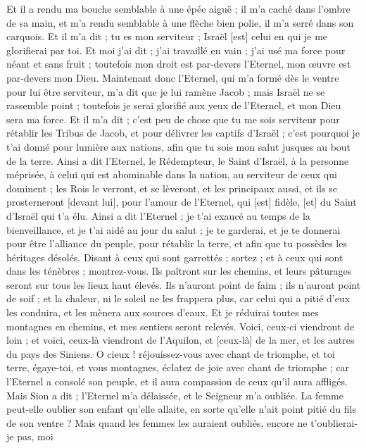 \begin{multicols}{2}
Et il a rendu ma bouche semblable à une épée aiguë ; il m'a caché dans l'ombre de sa main, et m'a rendu semblable à une flèche bien polie, il m'a serré dans son carquois.
Et il m'a dit ; tu es mon serviteur ; Israël [est] celui en qui je me glorifierai par toi.
Et moi j'ai dit ; j'ai travaillé en vain ; j'ai usé ma force pour néant et sans fruit ; toutefois mon droit est par-devers l'Eternel, mon œuvre est par-devers mon Dieu.
Maintenant donc l'Eternel, qui m'a formé dès le ventre pour lui être serviteur, m'a dit que je lui ramène Jacob ; mais Israël ne se rassemble point ; toutefois je serai glorifié aux yeux de l'Eternel, et mon Dieu sera ma force.
Et il m'a dit ; c'est peu de chose que tu me sois serviteur pour rétablir les Tribus de Jacob, et pour délivrer les captifs d'Israël ; c'est pourquoi je t'ai donné pour lumière aux nations, afin que tu sois mon salut jusques au bout de la terre.
Ainsi a dit l'Eternel, le Rédempteur, le Saint d'Israël, à la personne méprisée, à celui qui est abominable dans la nation, au serviteur de ceux qui dominent ; les Rois le verront, et se lèveront, et les principaux aussi, et ils se prosterneront [devant lui], pour l'amour de l'Eternel, qui [est] fidèle, [et] du Saint d'Israël qui t'a élu.
Ainsi a dit l'Eternel ; je t'ai exaucé au temps de la bienveillance, et je t'ai aidé au jour du salut ; je te garderai, et je te donnerai pour être l'alliance du peuple, pour rétablir la terre, et afin que tu possèdes les héritages désolés.
Disant à ceux qui sont garrottés ; sortez ; et à ceux qui sont dans les ténèbres ; montrez-vous. Ils paîtront sur les chemins, et leurs pâturages seront sur tous les lieux haut élevés.
Ils n'auront point de faim ; ils n'auront point de soif ; et la chaleur, ni le soleil ne les frappera plus, car celui qui a pitié d'eux les conduira, et les mènera aux sources d'eaux.
Et je réduirai toutes mes montagnes en chemins, et mes sentiers seront relevés.
Voici, ceux-ci viendront de loin ; et voici, ceux-là viendront de l'Aquilon, et [ceux-là] de la mer, et les autres du pays des Siniens.
O cieux ! réjouissez-vous avec chant de triomphe, et toi terre, égaye-toi, et vous montagnes, éclatez de joie avec chant de triomphe ; car l'Eternel a consolé son peuple, et il aura compassion de ceux qu'il aura affligés.
Mais Sion a dit ; l'Eternel m'a délaissée, et le Seigneur m'a oubliée.
La femme peut-elle oublier son enfant qu'elle allaite, en sorte qu'elle n'ait point pitié du fils de son ventre ? Mais quand les femmes les auraient oubliés, encore ne t'oublierai-je pas, moi

\end{multicols}

